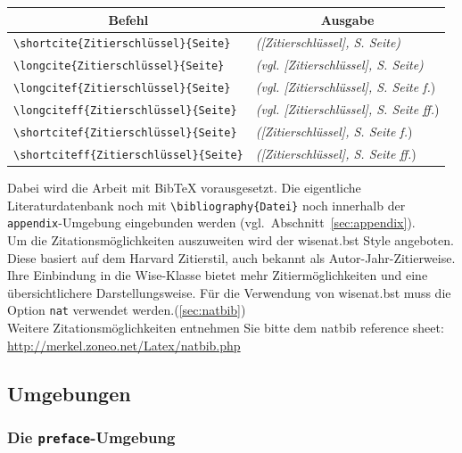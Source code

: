 \documentclass[english, trackchanges, hyperref, ngerman ,pdf, mp, mppdf]{wise}
\newcommand\code[1]{\texttt{#1}}
\newcommand\command[1]{\code{\textbackslash{}#1}}
\begin{document}
\vspace{0.3cm}
\begin{center}\begin{tabular}{|l|l|}
\hline 
\multicolumn{1}{|c|}{Befehl}&
\multicolumn{1}{c|}{Ausgabe}\\
\hline
\hline 
\command{shortcite\{Zitierschlüssel\}\{Seite\}}&
\textit{({[}Zitierschlüssel{]}, S. Seite)}\\
\hline 
\command{longcite\{Zitierschlüssel\}\{Seite\}}&
\textit{(vgl. {[}Zitierschlüssel{]}, S. Seite)}\\
\hline
\command{longcitef\{Zitierschlüssel\}\{Seite\}} & \textit{(vgl. {[Zitierschlüssel{]}}, S. Seite f.})\\
\hline
\command{longciteff\{Zitierschlüssel\}\{Seite\}} & \textit{(vgl. {[Zitierschlüssel{]}}, S. Seite ff.})\\
\hline
\command{shortcitef\{Zitierschlüssel\}\{Seite\}} & \textit{({[Zitierschlüssel{]}}, S. Seite f.})\\
\hline
\command{shortciteff\{Zitierschlüssel\}\{Seite\}} & \textit{({[Zitierschlüssel{]}}, S. Seite ff.})\\
\hline
\end{tabular}\end{center}
\vspace{0.3cm}

Dabei wird die Arbeit mit Bib\TeX{} vorausgesetzt. Die eigentliche
Literaturdatenbank noch mit \command{bibliography\{Datei\}}
noch innerhalb der \code{appendix}-Umgebung eingebunden werden (vgl.~Abschnitt~\ref{sec:appendix}).
\\

Um die Zitationsmöglichkeiten auszuweiten wird der wisenat.bst Style angeboten. Diese basiert auf dem Harvard Zitierstil, auch bekannt als Autor-Jahr-Zitierweise. Ihre Einbindung in die Wise-Klasse bietet mehr Zitiermöglichkeiten und eine übersichtlichere Darstellungsweise. Für die Verwendung von wisenat.bst muss die Option \code{nat} verwendet werden.(\ref{sec:natbib}) \\
Weitere Zitationsmöglichkeiten entnehmen Sie bitte dem \glqq natbib reference sheet\grqq :\\
\url{http://merkel.zoneo.net/Latex/natbib.php} 


\subsection{Umgebungen}


\subsubsection{Die \code{preface}-Umgebung}\label{sec:preface}
\end{document}
